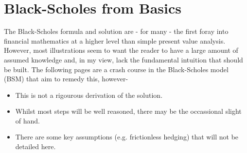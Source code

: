 \documentclass[../../Axiomathic.tex]{subfiles}
\begin{document}
\section{Black-Scholes from Basics}
The Black-Scholes formula and solution are - for many - the first foray into financial mathematics at a higher level than simple present value analysis. However, most illustrations seem to want the reader to have a large amount of assumed knowledge and, in my view, lack the fundamental intuition that should be built. The following pages are a crash course in the Black-Scholes model (BSM) that aim to remedy this, however-
\begin{itemize}
\item{This is not a rigourous derivation of the solution.}
\item{Whilst most steps will be well reasoned, there may be the occassional slight of hand.}
\item{There are some key assumptions (e.g. frictionless hedging) that will not be detailed here.}
\end{itemize}
\end{document}
